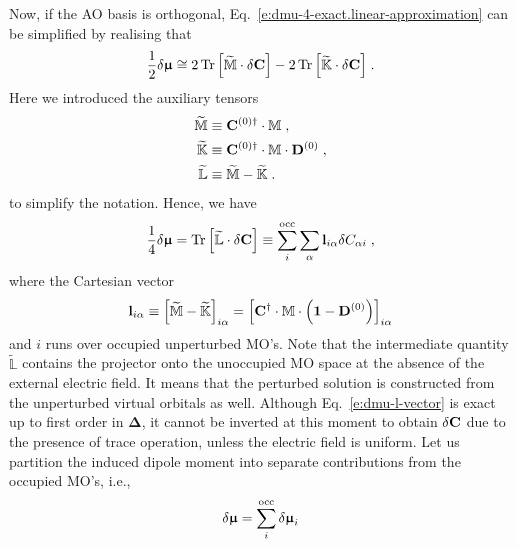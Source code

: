 \documentclass[aip,amsmath,amssymb,reprint,floatfix]{revtex4-1}
\newcommand{\BM}[1]{\bm{#1}}
\DeclareMathOperator{\Tr}{Tr}
\begin{document}
Now, if the AO basis is orthogonal, Eq.~\eqref{e:dmu-4-exact.linear-approximation} can be simplified by realising that
%
\begin{equation}
 \frac{1}{2} 
 \delta {\BM{\upmu}}
  \cong
2 \Tr{ 
    \left[ 
         \widetilde{\mathbb{M}} \cdot \delta {\bf C}
   \right] }  
-
2 \Tr{ 
    \left[ 
         \widetilde{\mathbb{K}} \cdot \delta {\bf C}
   \right] } \;.
\end{equation}
%
Here we introduced the auxiliary tensors
%
\begin{subequations}
 \begin{align}
   \widetilde{\mathbb{M}}  &\equiv {\bf C}^{(0)\dagger} \cdot {\mathbb{M}}     \;,           \\
   \widetilde{\mathbb{K}}  &\equiv {\bf C}^{(0)\dagger} \cdot {\mathbb{M}} \cdot {\bf D}^{(0)} \;, \\
   \widetilde{\mathbb{L}}  &\equiv \widetilde{\mathbb{M}} - \widetilde{\mathbb{K}} \;.
 \end{align}
\end{subequations}
%
to simplify the notation. Hence, we have
%
\begin{equation} \label{e:dmu-l-vector}
  \frac{1}{4} 
 \delta {\BM{\upmu}} %
   =
   \Tr{ 
    \left[ 
         \widetilde{\mathbb{L}} \cdot \delta {\bf C}
    \right] }
   \equiv \sum_{i}^{\rm occ} \sum_\alpha {\bf l}_{i\alpha} \delta C_{\alpha i} \;,
\end{equation}
%
where the Cartesian vector
%
\begin{equation}\label{e:l-vector}
 {\bf l}_{i\alpha} \equiv \left[ \widetilde{\mathbb{M}} - \widetilde{\mathbb{K}} \right]_{i\alpha} 
      = \left[  {\bf C}^\dagger \cdot \mathbb{M} \cdot \left( {\bf 1} - {\bf D}^{(0)} \right) \right]_{i\alpha}
\end{equation}
%
and $i$ runs over occupied unperturbed MO's.
Note that the intermediate quantity $\widetilde{\mathbb{L}}$ contains the projector onto
the unoccupied MO space at the absence of the external electric field. It means that the
perturbed solution is constructed from the unperturbed virtual orbitals as well.
Although Eq.~\eqref{e:dmu-l-vector}
is exact up to first order in ${\BM\Delta}$, it cannot be inverted at this moment to obtain $\delta {\bf C}$
due to the presence of trace operation, unless the electric field is uniform.
Let us partition the induced dipole moment into separate contributions
from the occupied MO's, i.e.,
%
\begin{equation} \label{e:dmu-part}
 \delta {\BM{\upmu}} = \sum_i^{\rm occ} \delta {\BM{\upmu}}_i
\end{equation}
\end{document}
